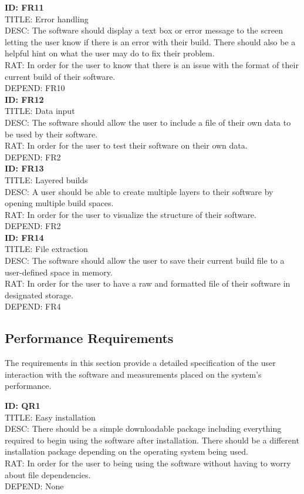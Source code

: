 \documentclass[journal,10pt,onecolumn,compsoc]{IEEEtran} \usepackage[margin=1.0in]{geometry} \usepackage{pdfpages} \usepackage{graphicx}
\begin{document}
\noindent
\textbf{ID: FR11}\\
TITLE: Error handling\\
DESC: The software should display a text box or error message to the screen letting the user know if there is an error with their build. 
There should also be a helpful hint on what the user may do to fix their problem.\\
RAT: In order for the user to know that there is an issue with the format of their current build of their software.\\
DEPEND: FR10\\

\noindent
\textbf{ID: FR12}\\
TITLE: Data input\\
DESC: The software should allow the user to include a file of their own data to be used by their software.\\
RAT: In order for the user to test their software on their own data.\\
DEPEND: FR2\\

\noindent
\textbf{ID: FR13}\\
TITLE: Layered builds\\
DESC: A user should be able to create multiple layers to their software by opening multiple build spaces.\\
RAT: In order for the user to visualize the structure of their software.\\
DEPEND: FR2\\

\noindent
\textbf{ID: FR14}\\
TITLE: File extraction\\
DESC: The software should allow the user to save their current build file to a user-defined space in memory.\\
RAT: In order for the user to have a raw and formatted file of their software in designated storage.\\
DEPEND: FR4\\


\subsection{Performance Requirements}

The requirements in this section provide a detailed specification of the user interaction with the software and measurements placed on the system's performance.

\noindent
\textbf{ID: QR1}\\
TITLE: Easy installation\\
DESC: There should be a simple downloadable package including everything required to begin using the software after installation.
There should be a different installation package depending on the operating system being used.\\
RAT: In order for the user to being using the software without having to worry about file dependencies.\\
DEPEND: None\\
\end{document}
